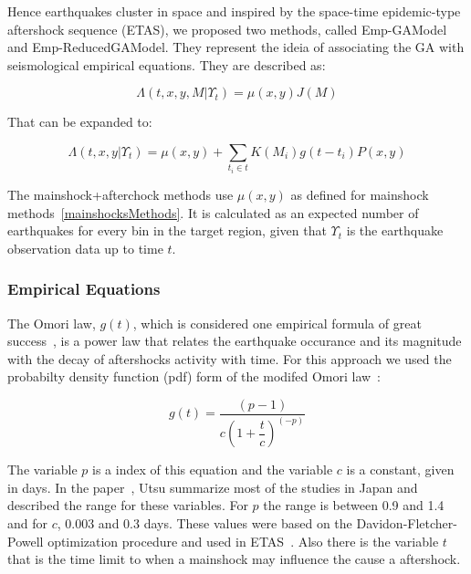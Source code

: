 Hence earthquakes cluster in space and inspired by the space-time epidemic-type aftershock sequence (ETAS), we proposed two methods, called Emp-GAModel and Emp-ReducedGAModel. They represent the ideia of associating the GA with seismological empirical equations. They are described as:

\begin{equation}\label{reducedgamodel}
	\Lambda(t,x,y,M|\Upsilon_t) = \mu(x,y)J(M)
\end{equation}

That can be expanded to:

\begin{equation}\label{emp-model}
 \Lambda(t,x,y|\Upsilon_t) = \mu(x,y) + \displaystyle\sum_{t_i \in t} K(M_i)g(t-t_i)P(x,y)
\end{equation}

The mainshock+afterchock methods use $\mu(x,y)$ as defined for mainshock methods~\ref{mainshocksMethods}. It is calculated as an expected number of earthquakes for every bin in the target region, given that $\Upsilon_t$ is the earthquake observation data up to time $t$.\\

\subsubsection{Empirical Equations}

The Omori law, $g(t)$, which is considered one empirical formula of great success~\cite{zhuang2004analyzing}\cite{utsu1995centenary}\cite{omori1895after}, is a power law that relates the earthquake occurance and its magnitude with the decay of aftershocks activity with time. For this approach we used the probabilty density function (pdf) form of the modifed Omori law~\cite{zhuang2004analyzing}:

\begin{equation}\label{omori}
	g(t)= \dfrac{(p-1)}{c(1+ \dfrac{t}{c})^(-p)}
\end{equation}

The variable $p$ is a index of this equation and the variable $c$ is a constant, given in days. In the paper~\cite{utsu1995centenary}, Utsu summarize most of the studies in Japan and described the range for these variables. For $p$ the range is between 0.9 and 1.4 and for $c$, 0.003 and 0.3 days. These values were based on the Davidon-Fletcher-Powell optimization procedure and used in ETAS~\cite{utsu1995centenary}. Also there is the variable $t$ that is the time limit to when a mainshock may influence the cause a aftershock.\\

